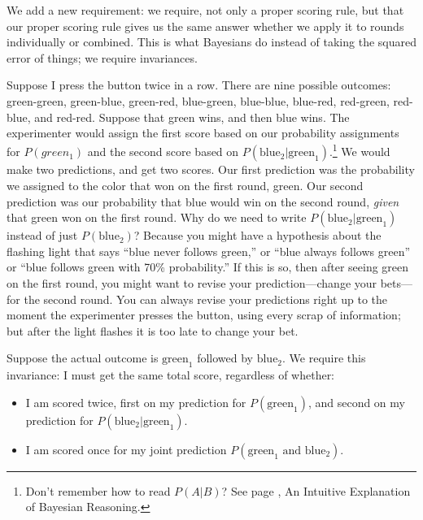 {
 We add a new requirement: we require, not only a proper scoring
rule, but that our proper scoring rule gives us the same answer whether
we apply it to rounds individually or combined. This is what Bayesians
do instead of taking the squared error of things; we require
invariances.}

{
 Suppose I press the button twice in a row. There are nine possible
outcomes: green-green, green-blue, green-red, blue-green, blue-blue,
blue-red, red-green, red-blue, and red-red. Suppose that green wins,
and then blue wins. The experimenter would assign the first score based
on our probability assignments for $P(green_{1})$ and the
second score based on
$P(\text{blue}_{2}|\text{green}_{1})$.\footnote{Don't remember how to read $P(A|B)$? See page \pageref{intuitive_bayesian},
An Intuitive Explanation of Bayesian Reasoning.}
We would make two predictions, and get two scores. Our first prediction
was the probability we assigned to the color that won on the first
round, green. Our second prediction was our probability that blue would
win on the second round, \textit{given} that green won on the first
round. Why do we need to write
$P(\text{blue}_{2}|\text{green}_{1})$ instead of
just $P(\text{blue}_{2})$? Because you might have a hypothesis
about the flashing light that says ``blue never
follows green,'' or ``blue always
follows green'' or ``blue follows
green with 70\% probability.'' If this is so, then
after seeing green on the first round, you might want to revise your
prediction---change your bets---for the second round. You can always
revise your predictions right up to the moment the experimenter presses
the button, using every scrap of information; but after the light
flashes it is too late to change your bet.}

{
 Suppose the actual outcome is $\text{green}_{1}$ followed by
$\text{blue}_{2}$. We require this invariance: I must get the same
total score, regardless of whether:}

\begin{itemize}
\item {
 I am scored twice, first on my prediction for
$P(\text{green}_{1})$, and second on my prediction for
$P(\text{blue}_{2}|\text{green}_{1})$.}

\item {
 I am scored once for my joint prediction $P(\text{green}_{1}
 \text{ and } \text{blue}_{2})$.}
\end{itemize}

